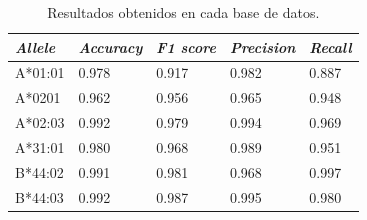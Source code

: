 \begin{table}[]
	\centering
	\caption{Resultados obtenidos en cada base de datos. }
	\label{tab:results}
	\setlength{\tabcolsep}{0.8em} %
	{\renewcommand{\arraystretch}{1.3}%
		\begin{tabular}{lllll}
			\hline
			\textit{\textbf{Allele}} & \textit{\textbf{Accuracy}} & \textit{\textbf{F1 score}} & \textit{\textbf{Precision}} & \textit{\textbf{Recall}} \\
			\hline
			A*01:01                  & 0.978                      & 0.917                      & 0.982                       & 0.887                    \\
			A*0201                   & 0.962                      & 0.956                      & 0.965                       & 0.948                    \\
			A*02:03                  & 0.992                      & 0.979                      & 0.994                       & 0.969                    \\
			A*31:01                  & 0.980                      & 0.968                      & 0.989                       & 0.951                    \\
			B*44:02                  & 0.991                      & 0.981                      & 0.968                       & 0.997                    \\
			B*44:03                  & 0.992                      & 0.987                      & 0.995                       & 0.980                   
		\end{tabular}
	}
\end{table}

